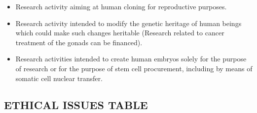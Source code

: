 \documentclass[12pt]{article}
\begin{document}
\begin{itemize}
\item             Research activity aiming at human cloning for reproductive purposes.
\item              Research activity intended to modify the genetic heritage of human beings which could make such changes heritable (Research related to cancer treatment of the gonads can be financed).
\item               Research activities intended to create human embryos solely for the purpose of research or for the purpose of stem cell procurement, including by means of somatic cell nuclear transfer.
\end{itemize}

\subsection*{ETHICAL ISSUES TABLE}
$\;$\\ $\;$\\
\end{document}
